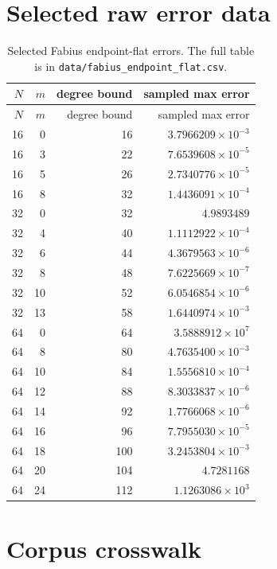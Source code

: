 \documentclass[11pt,oneside]{article}
\numberwithin{equation}{section}
\theoremstyle{definition}
\theoremstyle{remark}
\begin{document}
\section{Selected raw error data}
\label{app:data}

\begin{longtable}{rrrr}
\caption{Selected Fabius endpoint-flat errors.  The full table is in
\texttt{data/fabius\_endpoint\_flat.csv}.}\label{tab:raw-fabius}\\
\toprule
$N$ & $m$ & degree bound & sampled max error \\
\midrule
\endfirsthead
\toprule
$N$ & $m$ & degree bound & sampled max error \\
\midrule
\endhead
16&0&16&$3.7966209\times10^{-3}$\\
16&3&22&$7.6539608\times10^{-5}$\\
16&5&26&$2.7340776\times10^{-5}$\\
16&8&32&$1.4436091\times10^{-4}$\\
32&0&32&$4.9893489$\\
32&4&40&$1.1112922\times10^{-4}$\\
32&6&44&$4.3679563\times10^{-6}$\\
32&8&48&$7.6225669\times10^{-7}$\\
32&10&52&$6.0546854\times10^{-6}$\\
32&13&58&$1.6440974\times10^{-3}$\\
64&0&64&$3.5888912\times10^{7}$\\
64&8&80&$4.7635400\times10^{-3}$\\
64&10&84&$1.5556810\times10^{-4}$\\
64&12&88&$8.3033837\times10^{-6}$\\
64&14&92&$1.7766068\times10^{-6}$\\
64&16&96&$7.7955030\times10^{-5}$\\
64&18&100&$3.2453804\times10^{-3}$\\
64&20&104&$4.7281168$\\
64&24&112&$1.1263086\times10^{3}$\\
\bottomrule
\end{longtable}

\section{Corpus crosswalk}
\label{app:corpus}
\end{document}
